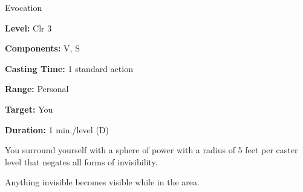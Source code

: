 
Evocation

\textbf{Level:} Clr 3

\textbf{Components:} V, S

\textbf{Casting Time:} 1 standard action

\textbf{Range:} Personal

\textbf{Target:} You

\textbf{Duration:} 1 min./level (D)

You surround yourself with a sphere of power with a radius of 5 feet per caster 
level that negates all forms of invisibility.

Anything invisible becomes visible while in the area.

